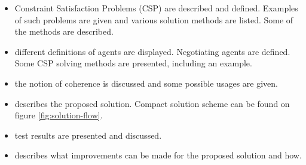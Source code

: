 \documentclass[header]{subfiles}
\begin{document}
\def\inChapter#1{In chapter \ref{chapter:#1}}
\def\showChapter#1{Chapter \ref{chapter:#1}}

\begin{itemize}[leftmargin=2.5cm]
  \item[\inChapter{csp}]
        Constraint Satisfaction Problems (CSP) are described and defined.
        Examples of such problems are given and various solution methods are
        listed. Some of the methods are described.
  \item[\inChapter{agents}]
        different definitions of agents are displayed. Negotiating agents are
        defined. Some CSP solving methods are presented, including an example.
  \item[\inChapter{Coherence}]
        the notion of coherence is discussed and some possible usages are given.
  \item[\showChapter{solution}]
        describes the proposed solution. Compact solution scheme can be found
        on figure \ref{fig:solution-flow}.
  \item[\inChapter{test}] test results are presented and discussed.
  \item[\showChapter{improvements}]
        describes what improvements can be made for the proposed solution and
        how.

\end{itemize}

\end{document}
